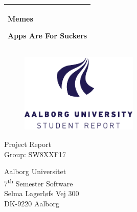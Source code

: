 %
\newcommand{\titlefont}{\sffamily\fontsize{36pt}{0pt}\selectfont}
\newcommand{\subtitlefont}{\sffamily\fontsize{26pt}{0pt}\selectfont}
\newcommand{\otherfont}{\sffamily\fontsize{18pt}{0pt}\selectfont}
\newcommand{\smallfont}{\sffamily\fontsize{12pt}{0pt}\selectfont}
\begin{titlepage}
    \addtolength{\hoffset}{0.5\evensidemargin-0.5\oddsidemargin} %
    \noindent%
    \begin{tabular}{@{}p{\textwidth}@{}}
        \toprule[2pt]
        \midrule
        \vspace{0.2cm}
        \begin{center}
        \titlefont Memes
        \end{center}
    \vspace{0.1cm}
        \begin{center}
        \subtitlefont Apps Are For Suckers
    \end{center}
        \vspace{0.2cm}\\
        \midrule
        \toprule[2pt]
    \end{tabular}
    \vspace{1.5 cm}
    \begin{figure}[h!]
        \centering
        \includegraphics[width=0.5\textwidth]{img/aau_logo_en.pdf}
    \end{figure}
    \vspace{1.5 cm}
    \begin{center}
        \otherfont
            Project Report
        \\
        \vspace{0.2cm}
        \otherfont
            Group: SW8XXF17
    \end{center}
    \vfill
    \begin{center}
    \smallfont
    Aalborg Universitet\\
    7\textsuperscript{th} Semester Software\\ \vspace{0.1cm}
    Selma Lagerløfs Vej 300\\
    DK-9220 Aalborg
    \end{center}
\end{titlepage}
\clearpage
\cleardoublepage
